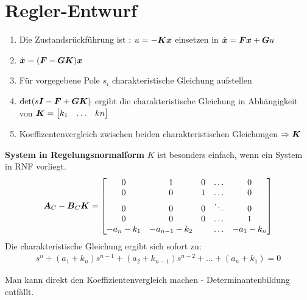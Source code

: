 \section{Regler-Entwurf}
\begin{tcolorbox}[colback=white!10!white,colframe=green!30!black] 

    \begin{enumerate}
        \item     Die Zustandsrückführung ist : $u = -\boldsymbol{Kx}$ einsetzen in $\dot{\boldsymbol{x}} = \boldsymbol{Fx}+\boldsymbol{G}u$
        \item $\dot{\boldsymbol{x}} = (\boldsymbol{F}-\boldsymbol{GK})\boldsymbol{x}$
        \item Für vorgegebene Pole $s_i$ charakteristische Gleichung aufstellen
        \item $\det (s\boldsymbol{I}-\boldsymbol{F}+\boldsymbol{GK})$ ergibt die charakteristische Gleichung in Abhängigkeit von $\boldsymbol{K} = \begin{bmatrix}
        k_1 & \ldots & kn
        \end{bmatrix}$
        \item Koeffizentenvergleich zwischen beiden charakteristischen Gleichungen $\Rightarrow \boldsymbol{K}$ 
    \end{enumerate} 
\tcblower
\textbf{System in Regelungsnormalform}
$K$ ist besonders einfach, wenn ein System in RNF vorliegt.
\begin{align*}
    \boldsymbol{A}_C-\boldsymbol{B}_C\boldsymbol{K} = \begin{bmatrix}
    0 & 1& 0&\ldots&0\\     0 & 0& 1&\ldots&0\\
    0 & 0& 0&\ddots&0\\
    0 & 0& 0&\ldots&1\\
    -a_n-k_1 & -a_{n-1}-k_2& &\ldots&-a_{1}-k_n\\
    \end{bmatrix}
\end{align*}
Die charakteristische Gleichung ergibt sich sofort zu:
\begin{align*}
    s^n +(a_1+k_n)s^{n-1}+(a_2+k_{n-1})s^{n-2}+\ldots+(a_n+k_1) =0 
\end{align*}

Man kann direkt den Koeffizientenvergleich machen - Determinantenbildung entfällt.
    
\end{tcolorbox}

